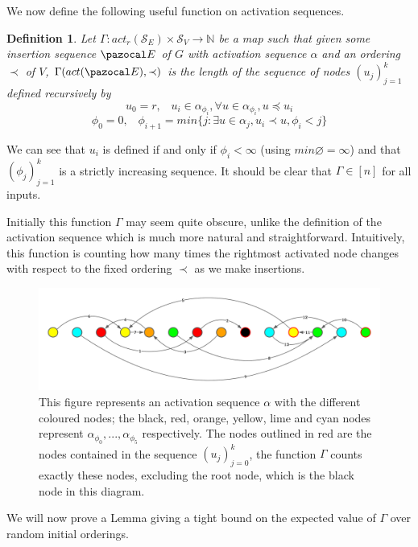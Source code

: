 \documentclass{report}
\newtheorem{definition}{Definition}
\begin{document}
We now define the following useful function on activation sequences.

\begin{definition}
Let $\Gamma : act_r(\mathcal{S}_{E}) \times \mathcal S_V \longrightarrow \mathbb{N}$ be a map such that given some insertion sequence $\pazocal E$ of $G$ with activation sequence $\alpha$ and an ordering $\prec$ of $V$, $\Gamma(act(\pazocal E), \prec)$ is the length of the sequence of nodes $(u_j)_{j=1}^k$ defined recursively by
\[ u_0 = r, \;\;\; u_i \in \alpha_{\phi_i},\forall u \in \alpha_{\phi_i}, u \preceq u_i \]
\[ \phi_0 = 0, \;\;\; \phi_{i+1} = min\{j : \exists u \in \alpha_j, u_i \prec u, \phi_i < j\}
\]
\end{definition}

We can see that $u_i$ is defined if and only if $\phi_i < \infty$ (using $min \varnothing = \infty$) and that $(\phi_j)_{j=1}^k$ is a strictly increasing sequence. It should be clear that $\Gamma \in [n]$ for all inputs.

Initially this function $\Gamma$ may seem quite obscure, unlike the definition of the activation sequence which is much more natural and straightforward. Intuitively, this function is counting how many times the rightmost activated node changes with respect to the fixed ordering $\prec$ as we make insertions.

\begin{figure}[htp]
    \centering
    \includegraphics[width=12cm]{ActSeqPic.png}
    \caption{This figure represents an activation sequence $\alpha$ with the different coloured nodes; the black, red, orange, yellow, lime and cyan nodes represent $\alpha_{\phi_0},...,\alpha_{\phi_5}$ respectively. The nodes outlined in red are the nodes contained in the sequence $(u_j)_{j=0}^k$, the function $\Gamma$ counts exactly these nodes, excluding the root node, which is the black node in this diagram.}
    \label{fig:activationsequence}
\end{figure}

We will now prove a Lemma giving a tight bound on the expected value of $\Gamma$ over random initial orderings.
\end{document}
